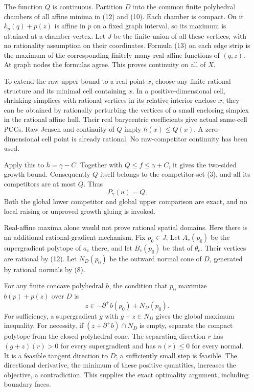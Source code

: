 \documentclass[
  11pt,
]{article}
\begin{document}
The function \(Q\) is continuous. Partition \(D\) into the common finite
polyhedral chambers of all affine minima in (12) and (10). Each chamber
is compact. On it \(k_p(q)+p(z)\) is affine in \(p\) on a fixed graph
interval, so its maximum is attained at a chamber vertex. Let \(J\) be
the finite union of all these vertices, with no rationality assumption
on their coordinates. Formula (13) on each edge strip is the maximum of
the corresponding finitely many real-affine functions of \((q,z)\). At
graph nodes the formulas agree. This proves continuity on all of \(X\).

To extend the raw upper bound to a real point \(x\), choose any finite
rational structure and its minimal cell containing \(x\). In a
positive-dimensional cell, shrinking simplices with rational vertices in
its relative interior enclose \(x\); they can be obtained by rationally
perturbing the vertices of a small enclosing simplex in the rational
affine hull. Their real barycentric coefficients give actual same-cell
PCCs. Raw Jensen and continuity of \(Q\) imply \(h(x)\leq Q(x)\). A
zero-dimensional cell point is already rational. No raw-competitor
continuity has been used.

Apply this to \(h=\gamma-C\). Together with \(Q\leq f\leq\gamma+C\), it
gives the two-sided growth bound. Consequently \(Q\) itself belongs to
the competitor set (3), and all its competitors are at most \(Q\). Thus
\[
                        P_\gamma(u)=Q.                                  \tag{14}
\] Both the global lower competitor and global upper comparison are
exact, and no local raising or unproved growth gluing is invoked.

Real-affine maxima alone would not prove rational spatial domains. Here
there is an additional rational-gradient mechanism. Fix \(p_0\in J\).
Let \(A_v(p_0)\) be the supergradient polytope of \(a_v\) there, and let
\(B_e(p_0)\) be that of \(\theta_e\). Their vertices are rational by
(12). Let \(N_D(p_0)\) be the outward normal cone of \(D\), generated by
rational normals by (8).

For any finite concave polyhedral \(b\), the condition that \(p_0\)
maximize \(b(p)+p(z)\) over \(D\) is \[
                    z\in-\partial^+b(p_0)+N_D(p_0).                      \tag{15}
\] For sufficiency, a supergradient \(g\) with \(g+z\in N_D\) gives the
global maximum inequality. For necessity, if \((z+\partial^+b)\cap N_D\)
is empty, separate the compact polytope from the closed polyhedral cone.
The separating direction \(r\) has \((g+z)(r)>0\) for every
supergradient and has \(n(r)\leq0\) for every normal. It is a feasible
tangent direction to \(D\); a sufficiently small step is feasible. The
directional derivative, the minimum of these positive quantities,
increases the objective, a contradiction. This supplies the exact
optimality argument, including boundary faces.
\end{document}
